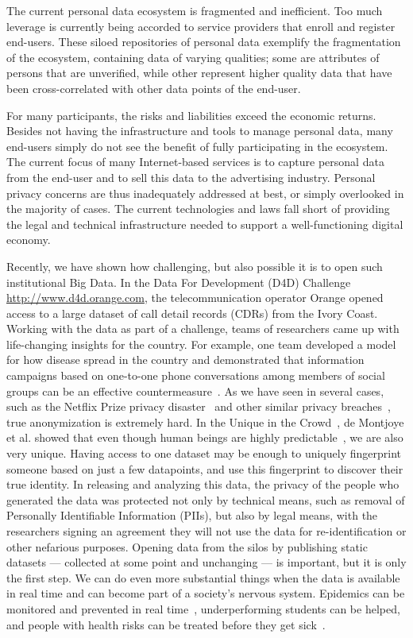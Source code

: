 The current personal data ecosystem is fragmented and inefficient.
Too much leverage is currently being accorded to service providers that enroll
and register end-users.
These siloed repositories of personal data exemplify the fragmentation of the ecosystem, containing data of varying qualities; some are attributes of persons that are unverified, while other represent higher quality data that have been cross-correlated with other data points of the end-user.

For many participants, the risks and liabilities exceed the economic returns.
Besides not having the infrastructure and tools to manage personal data, many end-users simply do not see the benefit of fully participating in the ecosystem.
The current focus of many Internet-based services is to capture personal data from the end-user and to sell this data to the advertising industry.
Personal privacy concerns are thus inadequately addressed at best, or simply overlooked in the majority of cases.
The current technologies and laws fall short of providing the legal and technical infrastructure needed to support a well-functioning digital economy.

Recently, we have shown how challenging, but also possible it is to open such institutional Big Data.
In the Data For Development (D4D) Challenge \url{http://www.d4d.orange.com}, the telecommunication operator Orange opened access to a large dataset of call detail records (CDRs) from the Ivory Coast.
Working with the data as part of a challenge, teams of researchers came up with life-changing insights for the country.
For example, one team developed a model for how disease spread in the country and demonstrated that information campaigns based on one-to-one phone conversations among members of social groups can be an effective countermeasure~\cite{lima2013exploiting}.
As we have seen in several cases, such as the Netflix Prize privacy disaster~\cite{narayanan2008robust} and other similar privacy breaches~\cite{sweeney2000simple}, true anonymization is extremely hard.
In the Unique in the Crowd~\cite{de2013unique}, de Montjoye et al. showed that even though human beings are highly predictable~\cite{song2010limits}, we are also very unique.
Having access to one dataset may be enough to uniquely fingerprint someone based on just a few datapoints, and use this fingerprint to discover their true identity.
In releasing and analyzing this data, the privacy of the people who generated the data was protected not only by technical means, such as removal of Personally Identifiable Information (PIIs), but also by legal means, with the researchers signing an agreement they will not use the data for re-identification or other nefarious purposes.
Opening data from the silos by publishing static datasets --- collected at some point and unchanging --- is important, but it is only the first step.
We can do even more substantial things when the data is available in real time and can become part of a society's nervous system.
Epidemics can be monitored and prevented in real time~\cite{pentland2009using}, underperforming students can be helped, and people with health risks can be treated before they get sick~\cite{tacconi2008activity}.


